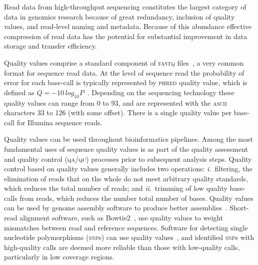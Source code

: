 \documentclass{bioinfo}
\begin{document}
Read data from high-throughput sequencing constitutes the largest
category of data in genomics research because of great redundancy,
inclusion of quality values, and read-level naming and
metadata. Because of this abundance effective compression of read data
has the potential for substantial improvement in data storage and
transfer efficiency.

Quality values comprise a standard component of \textsc{fastq}
files~\citep{Cock:2010ve}, a very common format for sequence read
data. At the level of sequence read the probability of error for each
base-call is typically represented by \textsc{phred} quality value,
which is defined as $Q =
-10\,log_{10}P$~\citep{Ewing:1998ly}. Depending on the sequencing
technology these quality values can range from 0 to 93, and are
represented with the \textsc{ascii} characters 33 to 126 (with some
offset). There is a single quality value per base-call for Illumina
sequence reads.

Quality values can be used throughout bioinformatics pipelines. Among
the most fundamental uses of sequence quality values is as part of the
quality assessment and quality control (\textsc{qa/qc}) processes
prior to subsequent analysis steps. Quality control based on quality
values generally includes two operations: \textit{i}.~filtering, the
elimination of reads that on the whole do not meet arbitrary quality
standards, which reduces the total number of reads; and
\textit{ii}.~trimming of low quality base-calls from reads, which
reduces the number total number of bases. Quality values can be used
by genome assembly software to produce better
assemblies~\cite[e.g.,][]{Bryant:2009uq,Gnerre:2011kx}. Short-read
alignment software, such as Bowtie2~\citep{Langmead:2012rw}, use
quality values to weight mismatches between read and reference
sequences. Software for detecting single nucleotide polymorphisms
(\textsc{snp}s) can use quality values~\cite[e.g.,][]{McKenna:2010bh},
and identified \textsc{snp}s with high-quality calls are deemed more
reliable than those with low-quality calls, particularly in low
coverage regions.
\end{document}
